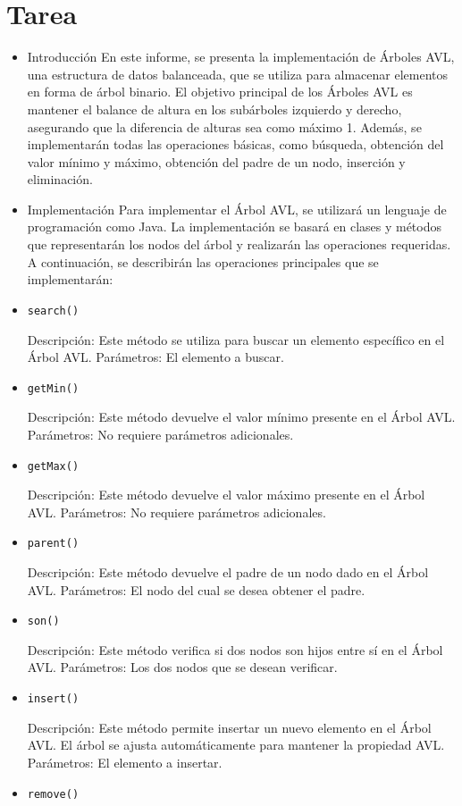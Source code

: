 \documentclass{article}
\begin{document}
	\section{Tarea}
	\begin{itemize}
		\item Introducción
En este informe, se presenta la implementación de Árboles AVL, una estructura de datos balanceada, que se utiliza para almacenar elementos en forma de árbol binario. El objetivo principal de los Árboles AVL es mantener el balance de altura en los subárboles izquierdo y derecho, asegurando que la diferencia de alturas sea como máximo 1. Además, se implementarán todas las operaciones básicas, como búsqueda, obtención del valor mínimo y máximo, obtención del padre de un nodo, inserción y eliminación.

\item Implementación
Para implementar el Árbol AVL, se utilizará un lenguaje de programación como Java. La implementación se basará en clases y métodos que representarán los nodos del árbol y realizarán las operaciones requeridas. A continuación, se describirán las operaciones principales que se implementarán:

\item \texttt{search()}

Descripción: Este método se utiliza para buscar un elemento específico en el Árbol AVL.
Parámetros: El elemento a buscar.
\item \texttt{getMin()}

Descripción: Este método devuelve el valor mínimo presente en el Árbol AVL.
Parámetros: No requiere parámetros adicionales.
\item \texttt{getMax()}

Descripción: Este método devuelve el valor máximo presente en el Árbol AVL.
Parámetros: No requiere parámetros adicionales.
\item \texttt{parent()}

Descripción: Este método devuelve el padre de un nodo dado en el Árbol AVL.
Parámetros: El nodo del cual se desea obtener el padre.
\item \texttt{son()}

Descripción: Este método verifica si dos nodos son hijos entre sí en el Árbol AVL.
Parámetros: Los dos nodos que se desean verificar.
\item \texttt{insert()}

Descripción: Este método permite insertar un nuevo elemento en el Árbol AVL. El árbol se ajusta automáticamente para mantener la propiedad AVL.
Parámetros: El elemento a insertar.
\item \texttt{remove()}


\end{itemize}
\end{document}
